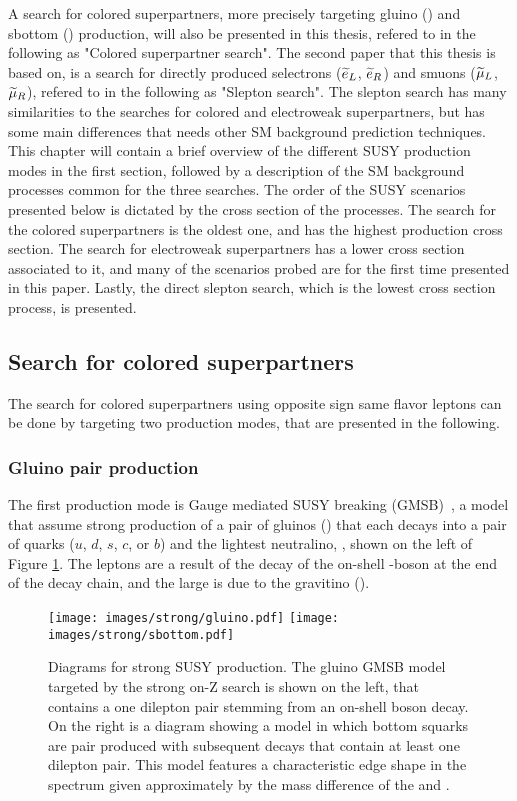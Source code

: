 A search for colored superpartners, more precisely targeting gluino (\gluino) and sbottom (\sbottom) production, will also be presented in this thesis, refered to in the following as "Colored superpartner search".
The second paper that this thesis is based on, is a search for directly produced selectrons ($\widetilde{e}_{L}$, $\widetilde{e}_{R}$) and smuons ($\widetilde{\mu}_{L}$, $\widetilde{\mu}_{R}$), refered to in the following as "Slepton search". 
The slepton search has many similarities to the searches for colored and electroweak superpartners, but has some main differences that needs other SM background prediction techniques. 
\newpara
\noindent\justify
This chapter will contain a brief overview of the different SUSY production modes in the first section, followed by a description of the SM background processes common for the three searches. 
The order of the SUSY scenarios presented below is dictated by the cross section of the processes. 
The search for the colored superpartners is the oldest one, and has the highest production cross section. 
The search for electroweak superpartners has a lower cross section associated to it, and many of the scenarios probed are for the first time presented in this paper. 
Lastly, the direct slepton search, which is the lowest cross section process, is presented. 
\subsection*{Search for colored superpartners}\label{sec:searchStrong}
\noindent\justify
The search for colored superpartners using opposite sign same flavor leptons can be done by targeting two production modes, that are presented in the following. 
\subsubsection*{Gluino pair production}
\noindent\justify
The first production mode is Gauge mediated SUSY breaking (GMSB)~\cite{Matchev:1999ft,Meade:2009qv,Ruderman}, a model that assume strong production of a pair of gluinos (\gluino) that each decays into a pair of quarks ($u$, $d$, $s$, $c$, or $b$) and the lightest neutralino, \PSGczDo, shown on the left of Figure \ref{fig:feynmanStrong}. 
The leptons are a result of the decay of the on-shell \PZ-boson at the end of the decay chain, and the large \ptmiss is due to the gravitino (\gravitino). 
\begin{figure}[!htp]
\centering
\texttt{[image: images/strong/gluino.pdf]}
\texttt{[image: images/strong/sbottom.pdf]}
\caption{Diagrams for strong SUSY production. 
The gluino GMSB model targeted by the strong on-Z search is shown on the left, that contains a one dilepton pair stemming from an on-shell \PZ boson decay. 
On the right is a diagram showing a model in which bottom squarks are pair produced with subsequent decays that contain at least one dilepton pair. This model features a characteristic edge shape in the \mll spectrum given approximately by the mass difference of the \PSGczDt and \PSGczDo.}
\label{fig:feynmanStrong}
\end{figure}                                                                                                                                          
